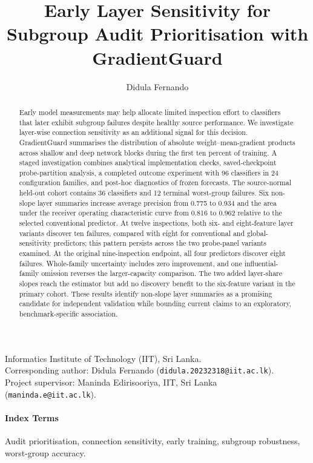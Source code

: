 \title{Early Layer Sensitivity for Subgroup Audit Prioritisation with GradientGuard}
\author{Didula Fernando}
\date{}
\maketitle
\noindent Informatics Institute of Technology (IIT), Sri Lanka.\\
Corresponding author: Didula Fernando (\texttt{didula.20232318@iit.ac.lk}).\\
Project supervisor: Maninda Edirisooriya, IIT, Sri Lanka (\texttt{maninda.e@iit.ac.lk}).
\begin{abstract}
Early model measurements may help allocate limited inspection effort to classifiers that later exhibit subgroup failures despite healthy source performance. We investigate layer-wise connection sensitivity as an additional signal for this decision. GradientGuard summarises the distribution of absolute weight--mean-gradient products across shallow and deep network blocks during the first ten percent of training. A staged investigation combines analytical implementation checks, saved-checkpoint probe-partition analysis, a completed outcome experiment with 96 classifiers in 24 configuration families, and post-hoc diagnostics of frozen forecasts. The source-normal held-out cohort contains 36 classifiers and 12 terminal worst-group failures. Six non-slope layer summaries increase average precision from 0.775 to 0.934 and the area under the receiver operating characteristic curve from 0.816 to 0.962 relative to the selected conventional predictor. At twelve inspections, both six- and eight-feature layer variants discover ten failures, compared with eight for conventional and global-sensitivity predictors; this pattern persists across the two probe-panel variants examined. At the original nine-inspection endpoint, all four predictors discover eight failures. Whole-family uncertainty includes zero improvement, and one influential-family omission reverses the larger-capacity comparison. The two added layer-share slopes reach the estimator but add no discovery benefit to the six-feature variant in the primary cohort. These results identify non-slope layer summaries as a promising candidate for independent validation while bounding current claims to an exploratory, benchmark-specific association.
\end{abstract}
\paragraph{Index Terms}
Audit prioritisation, connection sensitivity, early training, subgroup robustness, worst-group accuracy.



